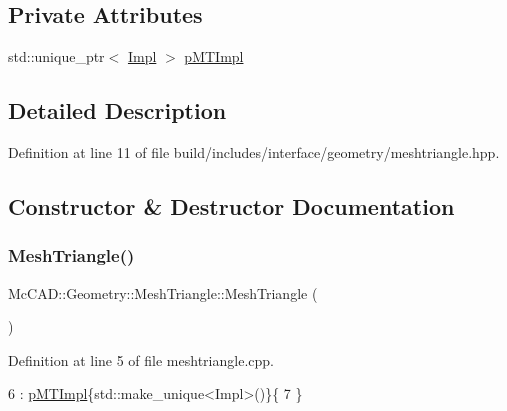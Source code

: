 \subsection*{Private Attributes}
\begin{DoxyCompactItemize}
\item 
std\+::unique\+\_\+ptr$<$ \hyperlink{classMcCAD_1_1Geometry_1_1MeshTriangle_1_1Impl}{Impl} $>$ \hyperlink{classMcCAD_1_1Geometry_1_1MeshTriangle_a1e7fcfc7c77cdeae2d25a8a989a53d09}{p\+M\+T\+Impl}
\end{DoxyCompactItemize}


\subsection{Detailed Description}


Definition at line 11 of file build/includes/interface/geometry/meshtriangle.\+hpp.



\subsection{Constructor \& Destructor Documentation}
\mbox{\label{classMcCAD_1_1Geometry_1_1MeshTriangle_a7730c10f9d7058ad6347a0323aead15d}} 
\subsubsection{\texorpdfstring{Mesh\+Triangle()}{MeshTriangle()}\hspace{0.1cm}{\footnotesize\ttfamily [1/2]}}
{\footnotesize\ttfamily Mc\+C\+A\+D\+::\+Geometry\+::\+Mesh\+Triangle\+::\+Mesh\+Triangle (\begin{DoxyParamCaption}{ }\end{DoxyParamCaption})}



Definition at line 5 of file meshtriangle.\+cpp.


\begin{DoxyCode}
6   : \hyperlink{classMcCAD_1_1Geometry_1_1MeshTriangle_a1e7fcfc7c77cdeae2d25a8a989a53d09}{pMTImpl}\{std::make\_unique<Impl>()\}\{
7 \}
\end{DoxyCode}
\mbox{\label{classMcCAD_1_1Geometry_1_1MeshTriangle_ae91f5ede4cafa8b41e3eeadb2365e4ed}} 
